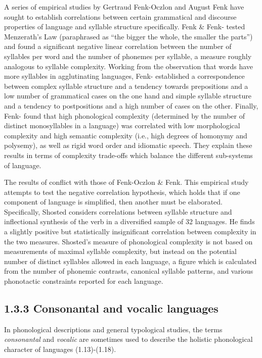   A series of empirical studies by Gertraud Fenk-Oczlon and August Fenk have sought to establish correlations between certain grammatical and discourse properties of language and syllable structure specifically. Fenk \& Fenk-\citet{Oczlon1993} tested Menzerath’s Law (paraphrased as “the bigger the whole, the smaller the parts”) and found a significant negative linear correlation between the number of syllables per word and the number of phonemes per syllable, a measure roughly analogous to syllable complexity. Working from the observation that words have more syllables in agglutinating languages, Fenk-\citet{OczlonFenk2005} established a correspondence between complex syllable structure and a tendency towards prepositions and a low number of grammatical cases on the one hand and simple syllable structure and a tendency to postpositions and a high number of cases on the other. Finally, Fenk-\citet{OczlonFenk2008} found that high phonological complexity (determined by the number of distinct monosyllables in a language) was correlated with low morphological complexity and high semantic complexity (i.e., high degrees of homonymy and polysemy), as well as rigid word order and idiomatic speech. They explain these results in terms of complexity trade-offs which balance the different sub-systems of language.

  The results of \citet{Shosted2006} conflict with those of Fenk-Oczlon \& Fenk. This empirical study attempts to test the negative correlation hypothesis, which holds that if one component of language is simplified, then another must be elaborated. Specifically, Shosted considers correlations between syllable structure and inflectional synthesis of the verb in a diversified sample of 32 languages. He finds a slightly positive but statistically insignificant correlation between complexity in the two measures. Shosted’s measure of phonological complexity is not based on measurements of maximal syllable complexity, but instead on the potential number of distinct syllables allowed in each language, a figure which is calculated from the number of phonemic contrasts, canonical syllable patterns, and various phonotactic constraints reported for each language.

\subsection{1.3.3 Consonantal and vocalic languages}

  In phonological descriptions and general typological studies, the terms \textit{consonantal} and \textit{vocalic} are sometimes used to describe the holistic phonological character of languages (1.13)-(1.18).

